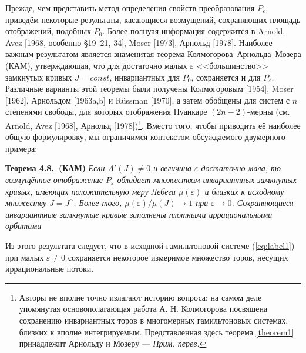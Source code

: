 \documentclass[twoside, a4paper]{article}
\begin{document}
Прежде, чем представить метод определения свойств преобразования $P_\varepsilon$, приведём некоторые результаты, касающиеся возмущений, сохраняющих площадь отображений, подобных $P_0$. Более полнуая информация содержится в Arnold, Avez [1968, особенно \S 19--21, 34], Moser [1973], Арнольд [1978]. Наиболее важным результатом является знаменитая теорема Колмогорова--Арнольда--Мозера (КАМ), утверждающая, что для достаточно малых $\varepsilon$ <<большинство>> замкнутых кривых $J=const$, инвариантных для $P_0$, сохраняется и для $P_\varepsilon$. Различные варианты этой теоремы были получены Колмогоровым [1954], Moser [1962], Арнольдом [1963a,b] и Rüssman [1970], а затем обобщены для систем с $n$ степенями свободы, для которых отображения Пуанкаре $(2n-2)$-мерны (см. Arnold, Avez [1968], Арнольд [1978])\footnote{Авторы не вполне точно излагают историю вопроса: на самом деле упомянутая основополагающая работа А. Н. Колмогорова посвящена сохранению инвариантных торов в многомерных гамильтоновых системах, близких к вполне интегрируемым. Представленная здесь теорема \ref{theorem1} принадлежит Арнольду и Мозеру --- \emph{Прим. перев.}}. Вместо того, чтобы приводить её наиболее общую формулировку, мы ограничимся контекстом обсуждаемого двумерного примера:
\renewcommand{\theteoremc}{4.8.\arabic{teoremc}}
\newcommand{\mytheorem}[2][]{\par\refstepcounter{teoremc} \textbf{Теорема \theteoremc ~#1} {\emph{#2}}}
\mytheorem[(КАМ)]{Если $A'(J)\neq 0$  и величина $\varepsilon$ достаточно мала, то возмущённое отображение $P_\varepsilon$ обладает множеством инвариантных замкнутых кривых, имеющих положительную меру Лебега $\mu (\varepsilon )$ и близких к исходному множеству $J = J^\alpha$. Более того, $\mu (\varepsilon)/\mu(J)\to 1$ при $\varepsilon \to 0$. Сохраняющиеся инвариантные замкнутые кривые заполнены плотными иррациональными орбитами}\label{theorem1}

Из этого результата следует, что в исходной гамильтоновой системе (\ref{eq:label1}) при малых $\varepsilon \neq 0$ сохраняется некоторое измеримое множество торов, несущих иррациональные потоки.
\end{document}
